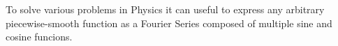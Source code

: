 \documentclass{article}
\begin{document}
To solve various problems in \Gls{Physics} it can useful to express any arbitrary piecewise-smooth function as a Fourier Series composed of multiple sine and cosine funcions.

\printglossaries
\end{document}
